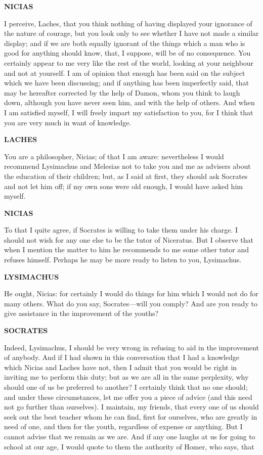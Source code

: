 \documentclass[11pt,letter]{article}
\begin{document}
\par \textbf{NICIAS}
\par   I perceive, Laches, that you think nothing of having displayed your ignorance of the nature of courage, but you look only to see whether I have not made a similar display; and if we are both equally ignorant of the things which a man who is good for anything should know, that, I suppose, will be of no consequence. You certainly appear to me very like the rest of the world, looking at your neighbour and not at yourself. I am of opinion that enough has been said on the subject which we have been discussing; and if anything has been imperfectly said, that may be hereafter corrected by the help of Damon, whom you think to laugh down, although you have never seen him, and with the help of others. And when I am satisfied myself, I will freely impart my satisfaction to you, for I think that you are very much in want of knowledge.

\par \textbf{LACHES}
\par   You are a philosopher, Nicias; of that I am aware:  nevertheless I would recommend Lysimachus and Melesias not to take you and me as advisers about the education of their children; but, as I said at first, they should ask Socrates and not let him off; if my own sons were old enough, I would have asked him myself.

\par \textbf{NICIAS}
\par   To that I quite agree, if Socrates is willing to take them under his charge. I should not wish for any one else to be the tutor of Niceratus. But I observe that when I mention the matter to him he recommends to me some other tutor and refuses himself. Perhaps he may be more ready to listen to you, Lysimachus.

\par \textbf{LYSIMACHUS}
\par   He ought, Nicias:  for certainly I would do things for him which I would not do for many others. What do you say, Socrates—will you comply? And are you ready to give assistance in the improvement of the youths?

\par \textbf{SOCRATES}
\par   Indeed, Lysimachus, I should be very wrong in refusing to aid in the improvement of anybody. And if I had shown in this conversation that I had a knowledge which Nicias and Laches have not, then I admit that you would be right in inviting me to perform this duty; but as we are all in the same perplexity, why should one of us be preferred to another? I certainly think that no one should; and under these circumstances, let me offer you a piece of advice (and this need not go further than ourselves). I maintain, my friends, that every one of us should seek out the best teacher whom he can find, first for ourselves, who are greatly in need of one, and then for the youth, regardless of expense or anything. But I cannot advise that we remain as we are. And if any one laughs at us for going to school at our age, I would quote to them the authority of Homer, who says, that
\end{document}
